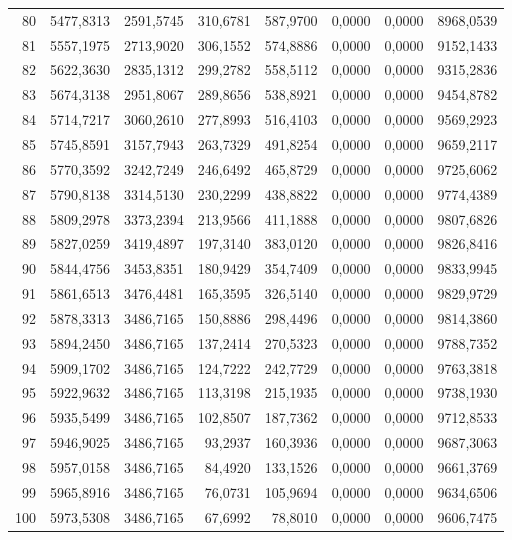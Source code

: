 \begin{small}
\begin{longtable}{rrrrrrrr}
80 & 5477,8313 & 2591,5745 & 310,6781 & 587,9700 & 0,0000 & 0,0000 & 8968,0539 \\
81 & 5557,1975 & 2713,9020 & 306,1552 & 574,8886 & 0,0000 & 0,0000 & 9152,1433 \\
82 & 5622,3630 & 2835,1312 & 299,2782 & 558,5112 & 0,0000 & 0,0000 & 9315,2836 \\
83 & 5674,3138 & 2951,8067 & 289,8656 & 538,8921 & 0,0000 & 0,0000 & 9454,8782 \\
84 & 5714,7217 & 3060,2610 & 277,8993 & 516,4103 & 0,0000 & 0,0000 & 9569,2923 \\
85 & 5745,8591 & 3157,7943 & 263,7329 & 491,8254 & 0,0000 & 0,0000 & 9659,2117 \\
86 & 5770,3592 & 3242,7249 & 246,6492 & 465,8729 & 0,0000 & 0,0000 & 9725,6062 \\
87 & 5790,8138 & 3314,5130 & 230,2299 & 438,8822 & 0,0000 & 0,0000 & 9774,4389 \\
88 & 5809,2978 & 3373,2394 & 213,9566 & 411,1888 & 0,0000 & 0,0000 & 9807,6826 \\
89 & 5827,0259 & 3419,4897 & 197,3140 & 383,0120 & 0,0000 & 0,0000 & 9826,8416 \\
90 & 5844,4756 & 3453,8351 & 180,9429 & 354,7409 & 0,0000 & 0,0000 & 9833,9945 \\
91 & 5861,6513 & 3476,4481 & 165,3595 & 326,5140 & 0,0000 & 0,0000 & 9829,9729 \\
92 & 5878,3313 & 3486,7165 & 150,8886 & 298,4496 & 0,0000 & 0,0000 & 9814,3860 \\
93 & 5894,2450 & 3486,7165 & 137,2414 & 270,5323 & 0,0000 & 0,0000 & 9788,7352 \\
94 & 5909,1702 & 3486,7165 & 124,7222 & 242,7729 & 0,0000 & 0,0000 & 9763,3818 \\
95 & 5922,9632 & 3486,7165 & 113,3198 & 215,1935 & 0,0000 & 0,0000 & 9738,1930 \\
96 & 5935,5499 & 3486,7165 & 102,8507 & 187,7362 & 0,0000 & 0,0000 & 9712,8533 \\
97 & 5946,9025 & 3486,7165 & 93,2937 & 160,3936 & 0,0000 & 0,0000 & 9687,3063 \\
98 & 5957,0158 & 3486,7165 & 84,4920 & 133,1526 & 0,0000 & 0,0000 & 9661,3769 \\
99 & 5965,8916 & 3486,7165 & 76,0731 & 105,9694 & 0,0000 & 0,0000 & 9634,6506 \\
100 & 5973,5308 & 3486,7165 & 67,6992 & 78,8010 & 0,0000 & 0,0000 & 9606,7475 \\
\end{longtable}
\end{small}
